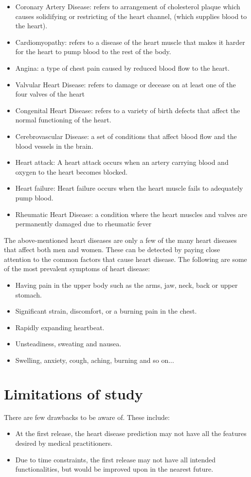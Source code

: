 \begin{itemize}
	\item{Coronary Artery Disease: refers to arrangement of cholesterol plaque which causes solidifying or restricting of the heart channel, (which supplies blood to the heart).}
	\item{Cardiomyopathy: refers to a disease of the heart muscle that makes it harder for the heart to pump blood to the rest of the body.}
	\item{Angina: a type of chest pain caused by reduced blood flow to the heart.}
	\item{Valvular Heart Disease: refers to damage or decease on at least one of the four valves of the heart}
	\item{Congenital Heart Disease: refers to a variety of birth defects that affect the normal functioning of the heart.}
	\item{Cerebrovascular Disease: a set of conditions that affect blood flow and the blood vessels in the brain.}
	\item{Heart attack: A heart attack occurs when an artery carrying blood and oxygen to the heart becomes blocked.}
	\item {Heart failure: Heart failure occurs when the heart muscle fails to adequately pump blood.}
	\item{Rheumatic Heart Disease: a condition where the heart muscles and valves are permanently damaged due to rheumatic fever}
\end{itemize}

The above-mentioned heart diseases are only a few of the many heart diseases that affect both men and women. These can be detected by paying close attention to the common factors that cause heart disease. The following are some of the most prevalent symptoms of heart disease:

\begin{itemize}
	\item{Having pain in the upper body such as the arms, jaw, neck, back or upper stomach.}
	\item{Significant strain, discomfort, or a burning pain in the chest.}
	\item{Rapidly expanding heartbeat.}
	\item{Unsteadiness, sweating and nausea.}
	\item{Swelling, anxiety, cough, aching, burning and so on...}
\end{itemize}

\section{Limitations of study}
There are few drawbacks to be aware of. These include:
\begin{itemize}
	\item{At the first release, the heart disease prediction may not have all the features desired by medical practitioners.}
	\item{Due to time constraints, the first release may not have all intended functionalities, but would be improved upon in the nearest future.}
\end{itemize}